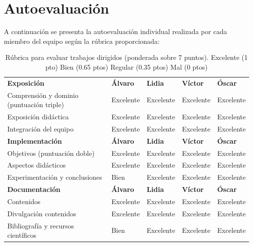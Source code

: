 \documentclass[a4paper]{article}
\begin{document}
\newpage
\section{Autoevaluación}
A continuación se presenta la autoevaluación individual realizada por cada miembro del equipo según la rúbrica proporcionada:

\begin{table}[htbp]
  \centering
  \scriptsize
  \renewcommand{\arraystretch}{1.5}
  \setlength{\tabcolsep}{4pt}
  \begin{tabular}{|>{\raggedright\arraybackslash}p{2.8cm}|>{\raggedright\arraybackslash}p{3cm}|>{\raggedright\arraybackslash}p{3cm}|>{\raggedright\arraybackslash}p{3cm}|>{\raggedright\arraybackslash}p{3cm}|}
  \hline
  \multicolumn{5}{|c|}{\textbf{Rúbrica para evaluar los trabajos dirigidos}} \\
  \hline
  \textbf{Exposición} &  \textbf{Álvaro} & \textbf{Lidia} & \textbf{Víctor} & \textbf{Óscar} \\
  \hline
  Comprensión y dominio (puntuación triple)& Excelente & Excelente & Excelente & Excelente \\
  \hline
  Exposición didáctica & Excelente & Excelente & Excelente & Excelente\\
  \hline
  Integración del equipo & Excelente & Excelente & Excelente & Excelente \\
  \hline
  \textbf{Implementación} & \textbf{Álvaro} & \textbf{Lidia} & \textbf{Víctor} & \textbf{Óscar} \\
  \hline
  Objetivos (puntuación doble)& Excelente & Excelente & Excelente & Excelente \\
  \hline
  Aspectos didácticos & Excelente & Excelente & Excelente & Excelente \\
  \hline
  Experimentación y conclusiones & Bien & Excelente & Excelente & Excelente \\
  \hline
  \textbf{Documentación} & \textbf{Álvaro} & \textbf{Lidia} & \textbf{Víctor} & \textbf{Óscar} \\
  \hline
  Contenidos & Excelente & Excelente & Excelente & Excelente \\
  \hline
  Divulgación contenidos & Excelente & Excelente & Excelente & Excelente \\
  \hline
  Bibliografía y recursos científicos & Bien & Excelente & Excelente & Excelente \\
  \hline
  \end{tabular}
  \caption{Rúbrica para evaluar trabajos dirigidos (ponderada sobre 7 puntos). Excelente (1 pto) Bien (0.65 ptos) Regular (0.35 ptos)  Mal (0 ptos)
  }
  \end{table}
\end{document}

